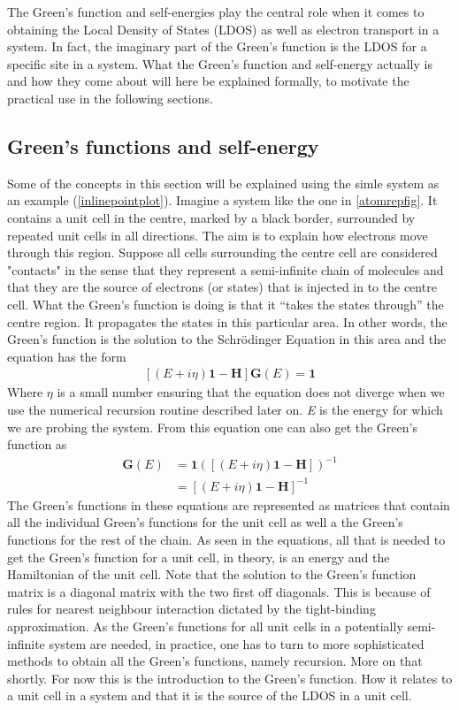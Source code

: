 The Green's function and self-energies play the central role when it comes to obtaining the Local Density of States (LDOS) as well as electron transport in a system. In fact, the imaginary part of the Green's function is the LDOS for a specific site in a system. What the Green's function and self-energy actually is and how they come about will here be explained formally, to motivate the practical use in the following sections.
\subsection{Green's functions and self-energy}\label{greensandself}
Some of the concepts in this section will be explained using the simle system as an example (\cref{inlinepointplot}). Imagine a system like the one in \cref{atomrepfig}. It contains a unit cell in the centre, marked by a black border, surrounded by repeated unit cells in all directions. The aim is to explain how electrons move through this region. Suppose all cells surrounding the centre cell are considered "contacts" in the sense that they represent a semi-infinite chain of molecules and that they are the source of electrons (or states) that is injected in to the centre cell. What the Green's function is doing is that it ``takes the states through'' the centre region. It propagates the states in this particular area. In other words, the Green's function is the solution to the Schr\"{o}dinger Equation in this area and the equation has the form
\begin{align}\label{Greensunsolved}
	[(E+i\eta)\mathbf{1}-\mathbf{H}]\mathbf{G}(E) = \mathbf{1}
\end{align}
Where \(\eta\) is a small number ensuring that the equation does not diverge when we use the numerical recursion routine described later on. \textit{E} is the energy for which we are probing the system.
From this equation one can also get the Green's function as
\begin{align}\label{Greenssolved}
	\mathbf{G}(E) & = \mathbf{1}([(E+i\eta)\mathbf{1}-\mathbf{H}])^{-1} \\
	              & = [(E+i\eta)\mathbf{1}-\mathbf{H}]^{-1}
\end{align}
The Green's functions in these equations are represented as matrices that contain all the individual Green's functions for the unit cell as well a the Green's functions for the rest of the chain. As seen in the equations, all that is needed to get the Green's function for a unit cell, in theory, is an energy and the Hamiltonian of the unit cell. Note that the solution to the Green's function matrix is a diagonal matrix with the two first off diagonals. This is because of rules for nearest neighbour interaction dictated by the tight-binding approximation. As the Green's functions for all unit cells in a potentially semi-infinite system are needed, in practice, one has to turn to more sophisticated methods to obtain all the Green's functions, namely recursion. More on that shortly. For now this is the introduction to the Green's function. How it relates to a unit cell in a system and that it is the source of the LDOS in a unit cell.\\
